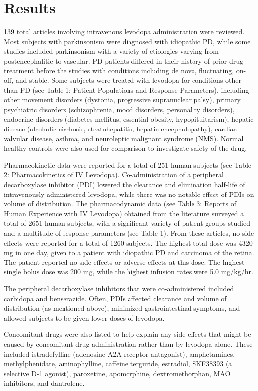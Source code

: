 \section{Results}
139 total articles involving intravenous levodopa administration were reviewed.  Most subjects with parkinsonism were diagnosed with idiopathic PD, while some studies included parkinsonism with a variety of etiologies varying from postencephalitic to vascular.  PD patients differed in their history of prior drug treatment before the studies with conditions including de novo, fluctuating, on-off, and stable.  Some subjects were treated with levodopa for conditions other than PD (see Table 1: Patient Populations and Response Parameters), including other movement disorders (dystonia, progressive supranuclear palsy), primary psychiatric disorders (schizophrenia, mood disorders, personality disorders),  endocrine disorders (diabetes mellitus, essential obesity, hypopituitarism), hepatic disease (alcoholic cirrhosis, steatohepatitis, hepatic encephalopathy), cardiac valvular disease, asthma, and neuroleptic malignant syndrome (NMS).  Normal healthy controls were also used for comparison to investigate safety of the drug.

Pharmacokinetic data were reported for a total of 251 human subjects (see Table 2: Pharmacokinetics of IV Levodopa).  Co-administration of a peripheral decarboxylase inhibitor (PDI) lowered the clearance and elimination half-life of intravenously administered levodopa, while there was no notable effect of PDIs on volume of distribution.
The pharmacodynamic data (see Table 3: Reports of Human Experience with IV Levodopa) obtained from the literature  surveyed a total of 2651 human subjects, with a significant variety of patient groups studied and a multitude of response parameters (see Table 1).  From these articles, no side effects were reported for a total of 1260 subjects.  The highest total dose was 4320 mg in one day, given to a patient with idiopathic PD and carcinoma of the retina.  The patient reported no side effects or adverse effects at this dose.  The highest single bolus dose was 200 mg, while the highest infusion rates were 5.0 mg/kg/hr.

The peripheral decarboxylase inhibitors that were co-administered included carbidopa and benserazide.  Often, PDIs affected clearance and volume of distribution (as mentioned above), minimized gastrointestinal symptoms, and allowed subjects to be given lower doses of levodopa.    

Concomitant drugs were also listed to help explain any side effects that might be caused by concomitant drug administration rather than by levodopa alone.  These included istradefylline (adenosine A2A receptor antagonist), amphetamines, methylphenidate, aminophylline, caffeine terguride, estradiol, SKF38393 (a selective D-1 agonist), paroxetine, apomorphine, dextromethorphan, MAO inhibitors, and dantrolene.  

